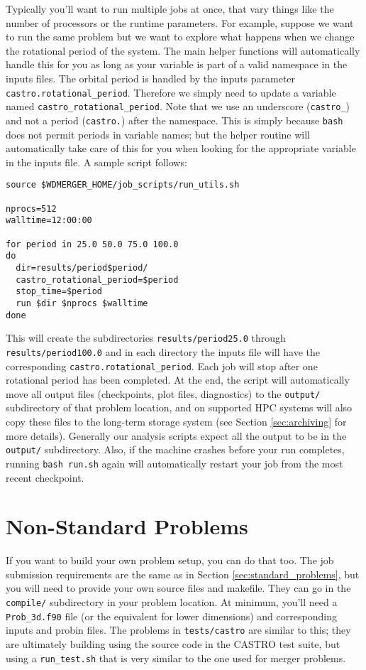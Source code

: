 \documentclass[12pt]{book}
\begin{document}
Typically you'll want to run multiple jobs at once, that vary things like the number of processors 
or the runtime parameters. For example, suppose we want to run the same problem but we want to 
explore what happens when we change the rotational period of the system. The main helper functions 
will automatically handle this for you as long as your variable is part of a valid namespace in the inputs files.
The orbital period is handled by the inputs parameter \texttt{castro.rotational\_period}. Therefore 
we simply need to update a variable named \texttt{castro\_rotational\_period}. 
Note that we use an underscore (\texttt{castro\_}) and not a period (\texttt{castro.}) after the namespace.
This is simply because \texttt{bash} does not permit periods in variable names; but the helper routine will 
automatically take care of this for you when looking for the appropriate variable in the inputs file.
A sample script follows:

\begin{lstlisting}
source $WDMERGER_HOME/job_scripts/run_utils.sh

nprocs=512
walltime=12:00:00

for period in 25.0 50.0 75.0 100.0
do
  dir=results/period$period/
  castro_rotational_period=$period
  stop_time=$period
  run $dir $nprocs $walltime
done
\end{lstlisting}%
This will create the subdirectories \texttt{results/period25.0} through \texttt{results/period100.0}
and in each directory the inputs file will have the corresponding \texttt{castro.rotational\_period}.
Each job will stop after one rotational period has been completed. At the end, the script will automatically move all 
output files (checkpoints, plot files, diagnostics)
to the \texttt{output/} subdirectory of that problem location, and on supported HPC systems will also copy these 
files to the long-term storage system (see Section \ref{sec:archiving} for more details). 
Generally our analysis scripts expect all the output to be in the 
\texttt{output/} subdirectory. Also, if the machine crashes before your run completes, running \texttt{bash run.sh}
again will automatically restart your job from the most recent checkpoint.

\section{Non-Standard Problems}
\label{sec:non-standard_problems}

If you want to build your own problem setup, you can do that too. The job submission 
requirements are the same as in Section \ref{sec:standard_problems}, but you will need to provide 
your own source files and makefile. They can go in the \texttt{compile/} subdirectory in your problem location.
At minimum, you'll need a \texttt{Prob\_3d.f90} file (or the equivalent for lower dimensions) and
corresponding inputs and probin files. The problems in \texttt{tests/castro} are similar to this;
they are ultimately building using the source code in the CASTRO test suite, but using a
\texttt{run\_test.sh} that is very similar to the one used for merger problems.
\end{document}
